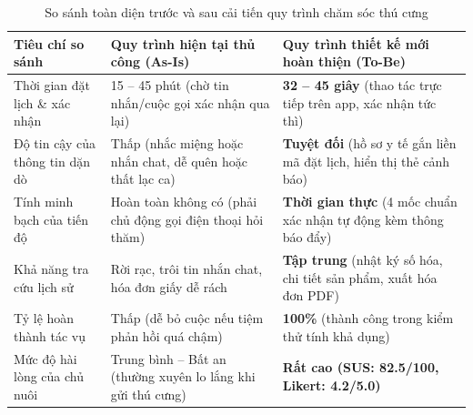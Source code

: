 \begin{table}[H]
\centering
\small
\begin{tabularx}{\textwidth}{|l|X|X|}
\hline
\textbf{Tiêu chí so sánh} & \textbf{Quy trình hiện tại thủ công (As-Is)} & \textbf{Quy trình thiết kế mới hoàn thiện (To-Be)} \\ \hline
Thời gian đặt lịch \& xác nhận & 15 -- 45 phút (chờ tin nhắn/cuộc gọi xác nhận qua lại) & \textbf{32 -- 45 giây} (thao tác trực tiếp trên app, xác nhận tức thì) \\ \hline
Độ tin cậy của thông tin dặn dò & Thấp (nhắc miệng hoặc nhắn chat, dễ quên hoặc thất lạc ca) & \textbf{Tuyệt đối} (hồ sơ y tế gắn liền mã đặt lịch, hiển thị thẻ cảnh báo) \\ \hline
Tính minh bạch của tiến độ & Hoàn toàn không có (phải chủ động gọi điện thoại hỏi thăm) & \textbf{Thời gian thực} (4 mốc chuẩn xác nhận tự động kèm thông báo đẩy) \\ \hline
Khả năng tra cứu lịch sử & Rời rạc, trôi tin nhắn chat, hóa đơn giấy dễ rách & \textbf{Tập trung} (nhật ký số hóa, chi tiết sản phẩm, xuất hóa đơn PDF) \\ \hline
Tỷ lệ hoàn thành tác vụ & Thấp (dễ bỏ cuộc nếu tiệm phản hồi quá chậm) & \textbf{100\%} (thành công trong kiểm thử tính khả dụng) \\ \hline
Mức độ hài lòng của chủ nuôi & Trung bình -- Bất an (thường xuyên lo lắng khi gửi thú cưng) & \textbf{Rất cao (SUS: 82.5/100, Likert: 4.2/5.0)} \\ \hline
\end{tabularx}
\caption{So sánh toàn diện trước và sau cải tiến quy trình chăm sóc thú cưng}
\label{tab:before_after_comparison}
\end{table}
